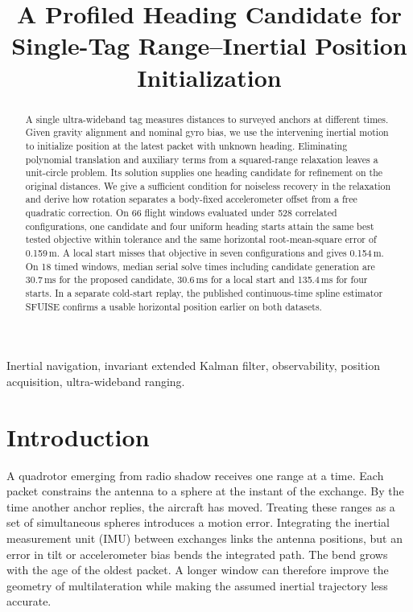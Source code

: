 \documentclass{IEEEtaes}
\begin{document}
\title{A Profiled Heading Candidate for Single-Tag Range--Inertial Position Initialization}
\author{}
\pagestyle{manuscript}
\let\manuscriptfootnotetext\footnotetext
\renewcommand{\footnotetext}[1]{}
\maketitle
\let\footnotetext\manuscriptfootnotetext
\thispagestyle{manuscript}

\begin{abstract}
A single ultra-wideband tag measures distances to surveyed anchors at different times. Given gravity alignment and nominal gyro bias, we use the intervening inertial motion to initialize position at the latest packet with unknown heading. Eliminating polynomial translation and auxiliary terms from a squared-range relaxation leaves a unit-circle problem. Its solution supplies one heading candidate for refinement on the original distances. We give a sufficient condition for noiseless recovery in the relaxation and derive how rotation separates a body-fixed accelerometer offset from a free quadratic correction. On 66 flight windows evaluated under 528 correlated configurations, one candidate and four uniform heading starts attain the same best tested objective within tolerance and the same horizontal root-mean-square error of 0.159\,m. A local start misses that objective in seven configurations and gives 0.154\,m. On 18 timed windows, median serial solve times including candidate generation are 30.7\,ms for the proposed candidate, 30.6\,ms for a local start and 135.4\,ms for four starts. In a separate cold-start replay, the published continuous-time spline estimator SFUISE confirms a usable horizontal position earlier on both datasets.
\end{abstract}
\begin{IEEEkeywords}
Inertial navigation, invariant extended Kalman filter, observability, position acquisition, ultra-wideband ranging.
\end{IEEEkeywords}

\section{Introduction}\label{sec:intro}
A quadrotor emerging from radio shadow receives one range at a time. Each packet constrains the antenna to a sphere at the instant of the exchange. By the time another anchor replies, the aircraft has moved. Treating these ranges as a set of simultaneous spheres introduces a motion error. Integrating the inertial measurement unit (IMU) between exchanges links the antenna positions, but an error in tilt or accelerometer bias bends the integrated path. The bend grows with the age of the oldest packet. A longer window can therefore improve the geometry of multilateration while making the assumed inertial trajectory less accurate.
\end{document}
